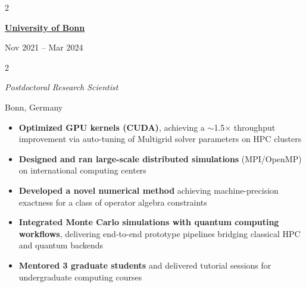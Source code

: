 \documentclass[
  18,
]{article}
\begin{document}
\vspace{9pt}

\begin{large}
  \begin{multicols}{2}
    \begin{flushleft}{\bf \href{https://www.uni-bonn.de/en/home?set_language=en}{University of Bonn}}\end{flushleft}
    \begin{flushright}Nov 2021 -- Mar 2024\end{flushright}
  \end{multicols}
  \vspace{-0.15cm}
  \begin{multicols}{2}
    \begin{flushleft}\textit{Postdoctoral Research Scientist}\end{flushleft}
    \begin{flushright}Bonn, Germany\end{flushright}
  \end{multicols}
\end{large}

\vspace{-0.09cm}

\begin{large}
  \begin{itemize}
    \item \textbf{Optimized GPU kernels (CUDA)}, achieving a $\sim$1.5$\times$ throughput improvement via auto-tuning of Multigrid solver parameters on HPC clusters
    \item \textbf{Designed and ran large-scale distributed simulations} (MPI/OpenMP) on international computing centers
    \item \textbf{Developed a novel numerical method} achieving machine-precision exactness for a class of operator algebra constraints
    \item \textbf{Integrated Monte Carlo simulations with quantum computing workflows}, delivering end-to-end prototype pipelines bridging classical HPC and quantum backends
    \item \textbf{Mentored 3 graduate students} and delivered tutorial sessions for undergraduate computing courses
  \end{itemize}
\end{large}

\vspace{9pt}
\end{document}
